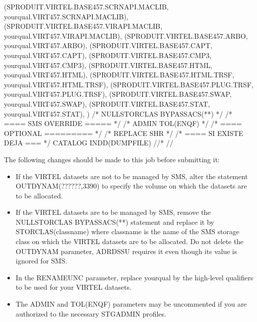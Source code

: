 \documentclass[letterpaper,10pt,english]{sphinxmanual}
\begin{document}
\begin{sphinxVerbatim}[commandchars=\\\{\}]
    (SPRODUIT.VIRTEL.BASE457.SCRNAPI.MACLIB, \PYGZhy{}
            yourqual.VIRT457.SCRNAPI.MACLIB), \PYGZhy{}
    (SPRODUIT.VIRTEL.BASE457.VIRAPI.MACLIB, \PYGZhy{}
            yourqual.VIRT457.VIRAPI.MACLIB), \PYGZhy{}
    (SPRODUIT.VIRTEL.BASE457.ARBO, \PYGZhy{}
            yourqual.VIRT457.ARBO), \PYGZhy{}
    (SPRODUIT.VIRTEL.BASE457.CAPT, \PYGZhy{}
            yourqual.VIRT457.CAPT), \PYGZhy{}
    (SPRODUIT.VIRTEL.BASE457.CMP3, \PYGZhy{}
            yourqual.VIRT457.CMP3), \PYGZhy{}
    (SPRODUIT.VIRTEL.BASE457.HTML, \PYGZhy{}
            yourqual.VIRT457.HTML), \PYGZhy{}
    (SPRODUIT.VIRTEL.BASE457.HTML.TRSF, \PYGZhy{}
            yourqual.VIRT457.HTML.TRSF), \PYGZhy{}
    (SPRODUIT.VIRTEL.BASE457.PLUG.TRSF, \PYGZhy{}
            yourqual.VIRT457.PLUG.TRSF), \PYGZhy{}
            (SPRODUIT.VIRTEL.BASE457.SWAP, \PYGZhy{}
                    yourqual.VIRT457.SWAP), \PYGZhy{}
            (SPRODUIT.VIRTEL.BASE457.STAT, \PYGZhy{}
                    yourqual.VIRT457.STAT), \PYGZhy{}
                    ) \textendash{}
    /* NULLSTORCLAS BYPASSACS(**) */ /* \PYGZlt{}==== SMS OVERRIDE ===== */ \PYGZhy{}
    /* ADMIN TOL(ENQF) */                    /* \PYGZlt{}==== OPTIONAL ========= */ \PYGZhy{}
    /* REPLACE SHR */                                /* \PYGZlt{}==== SI EXISTE DEJA === */ \PYGZhy{}
            CATALOG INDD(DUMPFILE)
    //*
    //
\end{sphinxVerbatim}


The following changes should be made to this job before submitting it:
\begin{itemize}
\item {} 
If the VIRTEL datasets are not to be managed by SMS, alter the statement OUTDYNAM(??????,3390) to specify the volume on which the datasets are to be allocated.

\item {} 
If the VIRTEL datasets are to be managed by SMS, remove the NULLSTORCLAS BYPASSACS(**) statement and replace it by STORCLAS(classname) where classname is the name of the SMS storage class on which the VIRTEL datasets are to be allocated. Do not delete the OUTDYNAM parameter, ADRDSSU requires it even though its value is ignored for SMS.

\item {} 
In the RENAMEUNC parameter, replace yourqual by the high-level qualifiers to be used for your VIRTEL datasets.

\item {} 
The ADMIN and TOL(ENQF) parameters may be uncommented if you are authorized to the necessary STGADMIN profiles.

\end{itemize}
\end{document}
